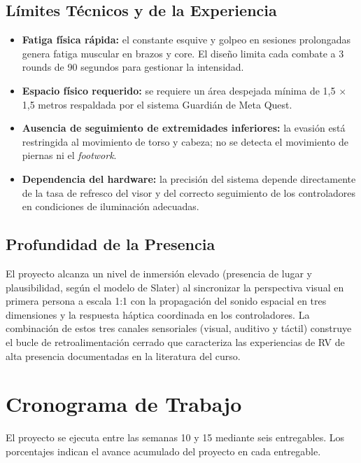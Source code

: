 \subsection{Límites Técnicos y de la Experiencia}
\begin{itemize}
  \item \textbf{Fatiga física rápida:} el constante esquive y golpeo en sesiones prolongadas genera fatiga muscular en brazos y core. El diseño limita cada combate a 3 rounds de 90 segundos para gestionar la intensidad.
  \item \textbf{Espacio físico requerido:} se requiere un área despejada mínima de 1,5 $\times$ 1,5 metros respaldada por el sistema Guardián de Meta Quest.
  \item \textbf{Ausencia de seguimiento de extremidades inferiores:} la evasión está restringida al movimiento de torso y cabeza; no se detecta el movimiento de piernas ni el \emph{footwork}.
  \item \textbf{Dependencia del hardware:} la precisión del sistema depende directamente de la tasa de refresco del visor y del correcto seguimiento de los controladores en condiciones de iluminación adecuadas.
\end{itemize}

\subsection{Profundidad de la Presencia}
El proyecto alcanza un nivel de inmersión elevado (presencia de lugar y plausibilidad, según el modelo de Slater) al sincronizar la perspectiva visual en primera persona a escala 1:1 con la propagación del sonido espacial en tres dimensiones y la respuesta háptica coordinada en los controladores. La combinación de estos tres canales sensoriales (visual, auditivo y táctil) construye el bucle de retroalimentación cerrado que caracteriza las experiencias de RV de alta presencia documentadas en la literatura del curso.

\section{Cronograma de Trabajo}
\label{sec:crono}
El proyecto se ejecuta entre las semanas 10 y 15 mediante seis entregables. Los porcentajes indican el avance acumulado del proyecto en cada entregable.


